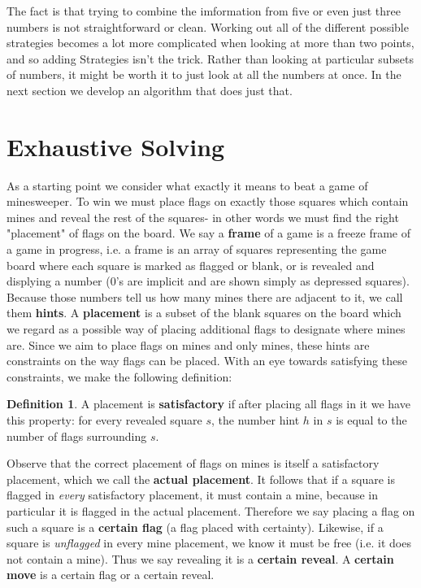 \documentclass{article}
\theoremstyle{definition}
\newtheorem{definition}{Definition}
\theoremstyle{definition}
\theoremstyle{theorem}
\begin{document}
	The fact is that trying to combine the imformation from five or even just three numbers is not straightforward or clean. Working out all of the different possible strategies becomes a lot more complicated when looking at more than two points, and so adding Strategies isn't the trick. Rather than looking at particular subsets of numbers, it might be worth it to just look at all the numbers at once. In the next section we develop an algorithm that does just that.
	\section{Exhaustive Solving}
	As a starting point we consider what exactly it means to beat a game of minesweeper. To win we must place flags on exactly those squares which contain mines and reveal the rest of the squares- in other words we must find the right "placement" of flags on the board. We say a  \textbf{frame} of a game is a freeze frame of a game in progress, i.e. a frame is an array of squares representing the game board where each square is marked as flagged or blank, or is revealed and displying a number (0's are implicit and are shown simply as depressed squares). Because those numbers tell us how many mines there are adjacent to it, we call them \textbf{hints}. A \textbf{placement} is a subset of the blank squares on the board which we regard as a possible way of placing additional flags to designate where mines are. Since we aim to place flags on mines and only mines, these hints are constraints on the way flags can be placed. With an eye towards satisfying these constraints, we make the following definition:
	\begin{definition}
		A placement is \textbf{satisfactory} if after placing all flags in it we have this property: for every revealed square $s$, the number hint $h$ in $s$ is equal to the number of flags surrounding $s$.
	\end{definition}
	Observe that the correct placement of flags on mines is itself a satisfactory placement, which we call the \textbf{actual placement}. It follows that if a square is flagged in \textit{every} satisfactory placement, it must contain a mine, because in particular it is flagged in the actual placement. Therefore we say placing a flag on such a square is a \textbf{certain flag} (a flag placed with certainty). Likewise, if a square is \textit{unflagged} in every mine placement, we know it must be free (i.e. it does not contain a mine). Thus we say revealing it is a \textbf{certain reveal}. A \textbf{certain move} is a certain flag or a certain reveal. 
	
\end{document}
